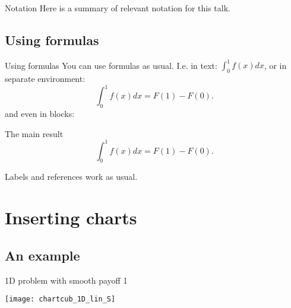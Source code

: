 \documentclass[10pt]{beamer}
\begin{document}
\begin{frame}{Notation}
Here is a summary of relevant notation for this talk. 
\end{frame}

\subsection{Using formulas}
\begin{frame}{Using formulas}
You can use formulas as usual. I.e. in text: $\int_0^1f(x)dx$, or in separate environment:
\begin{equation}
\int_0^1f(x)dx=F(1)-F(0).
\end{equation}
\pause
and even in blocks:
\begin{block}{The main result}
\begin{equation}
\int_0^1f(x)dx=F(1)-F(0).
\end{equation}

Labels and references work as usual.
\end{block}
\end{frame}


\section{Inserting charts}
\subsection{An example}
\begin{frame}{1D problem with smooth payoff 1}
\begin{block}{}
\centering
\texttt{[image: chartcub\_1D\_lin\_S]}
\end{block}
\end{frame}
\end{document}
